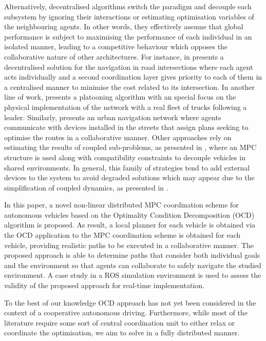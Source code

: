 \documentclass[letterpaper, 10 pt, conference]{ieeeconf}  %
\begin{document}
Alternatively, decentralised algorithms switch the paradigm and decouple each subsystem by ignoring their interactions or estimating optimisation variables of the neighbouring agents. In other words, they effectively assume that global performance is subject to maximising the performance of each individual in an isolated manner, leading to a competitive behaviour which opposes the collaborative nature of other architectures. For instance, in \cite{Hult2019} presents a decentralised solution for the navigation in road intersections where each agent acts individually and a second coordination layer gives priority to each of them in a centralised manner to minimise the cost related to its intersection. In another line of work, \cite{Lee2020} presents a platooning algorithm with an special focus on the physical implementation of the network with a real fleet of trucks following a leader. Similarly, \cite{Regragui2023} presents an urban navigation network where agents communicate with devices installed in the streets that assign plans seeking to optimise the routes in a collaborative manner. Other approaches rely on estimating the results of coupled sub-problems, as presented in \cite{mohseni2020distributed}, where an MPC structure is used along with compatibility constraints to decouple vehicles in shared environments. In general, this family of strategies tend to add external devices to the system to avoid degraded solutions which may appear due to the simplification of coupled dynamics, as presented in \cite{guillaume2008fast}. 

In this paper, a novel non-linear distributed MPC coordination scheme for autonomous vehicles based on the Optimality Condition Decomposition (OCD) algorithm is proposed. As result, a local planner for each vehicle is obtained via the OCD application to the MPC coordination scheme is obtained for each vehicle, providing realistic paths to be executed in a collaborative manner. The proposed approach is able to determine paths that consider both individual goals and the environment so that agents can collaborate to safely navigate the studied environment. A case study in a ROS simulation environment is used to assess the validity of the proposed approach for real-time implementation.

To the best of our knowledge OCD approach has not yet been considered in the context of a cooperative autonomous driving. Furthermore, while most of the literature require some sort of central coordination unit to either relax or coordinate the optimisation, we aim to solve in a fully distributed manner. 
\end{document}
